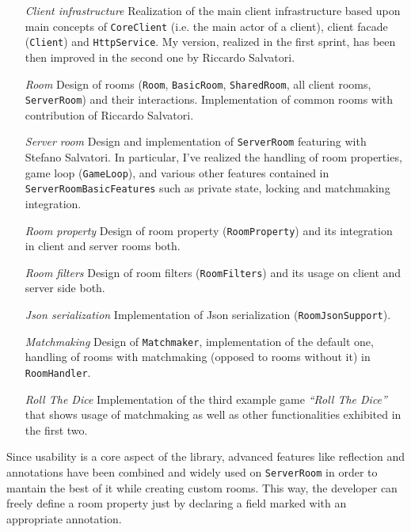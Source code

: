 \begin{itemize}

\item[\em{Client infrastructure}] Realization of the main client infrastructure based upon main concepts of \texttt{CoreClient} (i.e. the main actor of a client), client facade (\texttt{Client}) and \texttt{HttpService}. My version, realized in the first sprint, has been then improved in the second one by Riccardo Salvatori.

\item[\em{Room}] Design of rooms (\texttt{Room}, \texttt{BasicRoom}, \texttt{SharedRoom}, all client rooms, \texttt{ServerRoom}) and their interactions. Implementation of common rooms with contribution of Riccardo Salvatori.

\item[\em{Server room}] Design and implementation of \texttt{ServerRoom} featuring with Stefano Salvatori. In particular, I've realized the handling of room properties, game loop (\texttt{GameLoop}), and various other features contained in \texttt{ServerRoomBasicFeatures} such as private state, locking and matchmaking integration.

\item[\em{Room property}] Design of room property (\texttt{RoomProperty}) and its integration in client and server rooms both.

\item[\em{Room filters}] Design of room filters (\texttt{RoomFilters}) and its usage on client and server side both.

\item[\em{Json serialization}] Implementation of Json serialization (\texttt{RoomJsonSupport}).

\item[\em{Matchmaking}] Design of \texttt{Matchmaker}, implementation of the default one, handling of rooms with matchmaking (opposed to rooms without it) in \texttt{RoomHandler}.

\item[\em{Roll The Dice}] Implementation of the third example game \textit{``Roll The Dice''} that shows usage of matchmaking as well as other functionalities exhibited in the first two.

\end{itemize}

Since usability is a core aspect of the library, advanced features like reflection and annotations have been combined and widely used on \texttt{ServerRoom} in order to mantain the best of it while creating custom rooms. This way, the developer can freely define a room property just by declaring a field marked with an appropriate annotation.




